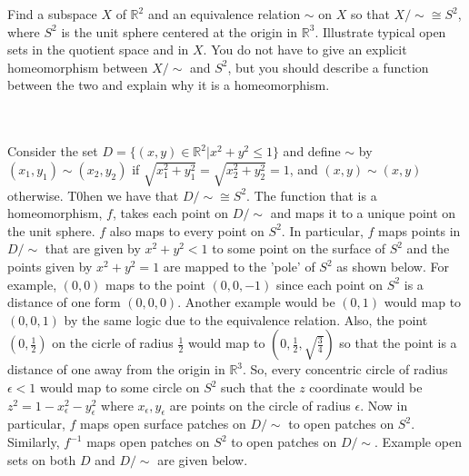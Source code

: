 Find a subspace $X$ of $\mathbb{R}^2$ and an equivalence relation $\sim$ on $X$ so that
$X/\sim\cong S^2$, where $S^2$ is the unit sphere centered at the origin in $\mathbb{R}^3$.
Illustrate typical open sets in the quotient space and in $X$. You do not have to give an explicit
homeomorphism between $X/\sim$ and $S^2$, but you should describe a function between the two and explain
why it is a homeomorphism.\\\\

\begin{solution}\renewcommand{\qedsymbol}{}\ \\
    Consider the set $D=\{(x,y)\in\mathbb{R}^2|x^2+y^2\leq1\}$ and define $\sim$ by
    $(x_1,y_1)\sim(x_2,y_2)$ if $\sqrt{x_1^2+y_1^2}=\sqrt{x_2^2+y_2^2}=1$, and $(x,y)\sim(x,y)$
    otherwise. T0hen we have that $D/\sim\cong S^2$. The function that is a homeomorphism, $f$, takes
    each point on $D/\sim$ and maps it to a unique point on the unit sphere. $f$ also maps to every
    point on $S^2$. In particular, $f$ maps points in $D/\sim$ that are given by $x^2+y^2<1$ to some
    point on the surface of $S^2$ and the points given by $x^2+y^2=1$ are mapped to the 'pole' of $S^2$
    as shown below. For example, $(0,0)$ maps to the point $(0,0,-1)$ since each point on $S^2$ is a
    distance of one form $(0,0,0)$. Another example would be $(0,1)$ would map to $(0,0,1)$ by the same
    logic due to the equivalence relation. Also, the point $(0,\frac12)$ on the cicrle of radius
    $\frac12$ would map to $(0,\frac12,\sqrt{\frac34})$ so that the point is a distance of one away from
    the origin in $\mathbb{R}^3$. So, every concentric circle of radius $\epsilon<1$ would map to some
    circle on $S^2$ such that the $z$ coordinate would be $z^2=1-x_{\epsilon}^2-y_{\epsilon}^2$ where
    $x_{\epsilon},y_{\epsilon}$ are points on the circle of radius $\epsilon$. Now in particular, $f$
    maps open surface patches on $D/\sim$ to open patches on $S^2$. Similarly, $f^{-1}$ maps open
    patches on $S^2$ to open patches on $D/\sim$. Example open sets on both $D$ and $D/\sim$ are given
    below.
    

\end{solution}
